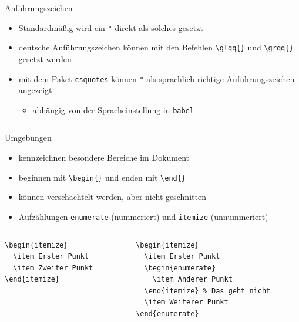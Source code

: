 \documentclass[presentation,aspectratio=169]{beamer}
\begin{document}
\begin{frame}[fragile]{Anführungszeichen}
  \begin{itemize}
    \item Standardmäßig wird ein \verb|"| direkt als solches gesetzt
    \item deutsche Anführungszeichen können mit den Befehlen \verb|\glqq{}| und \verb|\grqq{}| gesetzt werden
    \item mit dem Paket \verb|csquotes| können \verb|"| als sprachlich richtige Anführungszeichen angezeigt
      \begin{itemize}
        \item abhängig von der Spracheinstellung in \verb|babel|
      \end{itemize}
    \inputminted{latex}{codebeispiele/quotation.tex}
  \end{itemize}
\end{frame}

\begin{frame}[fragile]{Umgebungen}
  \begin{itemize}
    \item kennzeichnen besondere Bereiche im Dokument
    \item beginnen mit \verb|\begin{}| und enden mit \verb|\end{}|
    \item können verschachtelt werden, aber nicht geschnitten
    \item Aufzählungen \verb|enumerate| (nummeriert) und \verb|itemize| (unnummeriert)
  \end{itemize}
  \begin{columns}[t]
    \begin{column}{.3\textwidth}
      \centering
      \begin{verbatim}
\begin{itemize}
  \item Erster Punkt
  \item Zweiter Punkt
\end{itemize}
      \end{verbatim}
    \end{column}
    \begin{column}{.5\textwidth}
      \centering
      \begin{verbatim}
\begin{itemize}
  \item Erster Punkt
  \begin{enumerate}
    \item Anderer Punkt
  \end{itemize} % Das geht nicht
  \item Weiterer Punkt
\end{enumerate}
      \end{verbatim}
    \end{column}
  \end{columns}
\end{frame}
\end{document}
